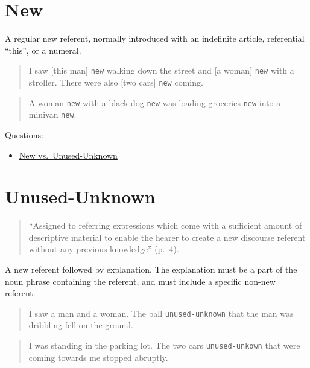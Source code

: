 \documentclass[
]{book}
\providecommand{\tightlist}{%
  \setlength{\itemsep}{0pt}\setlength{\parskip}{0pt}}
\begin{document}
\hypertarget{new}{%
\section{New}\label{new}}

A regular new referent, normally introduced with an indefinite article, referential ``this'', or a numeral.

\begin{quote}
I saw {[}this man{]} \texttt{new} walking down the street and {[}a woman{]} \texttt{new} with a stroller.
There were also {[}two cars{]} \texttt{new} coming.
\end{quote}

\begin{quote}
A woman \texttt{new} with a black dog \texttt{new} was loading groceries \texttt{new} into a minivan \texttt{new}.
\end{quote}

Questions:

\begin{itemize}
\tightlist
\item
  \protect\hyperlink{new-vs.-unused-unknown}{New vs.~Unused-Unknown}
\end{itemize}

\hypertarget{unused-unknown}{%
\section{Unused-Unknown}\label{unused-unknown}}

\begin{quote}
``Assigned to referring expressions which come with a sufficient amount of descriptive material to enable the hearer to create a new discourse referent without any previous knowledge'' (p.~4).
\end{quote}

A new referent followed by explanation.
The explanation must be a part of the noun phrase containing the referent, and must include a specific non-new referent.

\begin{quote}
I saw a man and a woman.
The ball \texttt{unused-unknown} that the man was dribbling fell on the ground.
\end{quote}

\begin{quote}
I was standing in the parking lot.
The two cars \texttt{unused-unkown} that were coming towards me stopped abruptly.
\end{quote}
\end{document}
